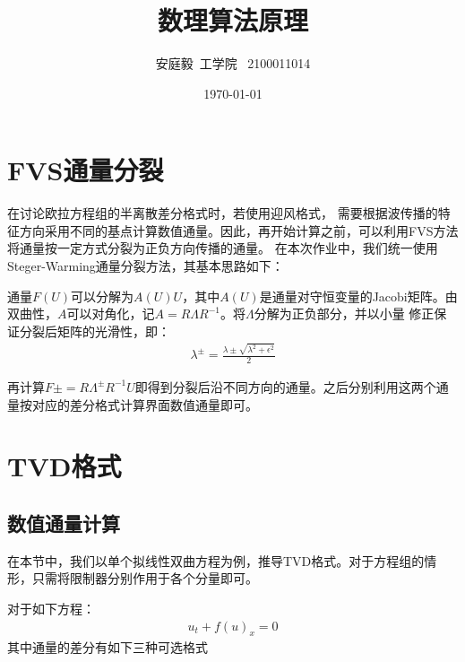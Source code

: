 \documentclass[12pt, a4paper]{article}
\title{数理算法原理}
\author{安庭毅\ 工学院 \ 2100011014}
\date{\today} %
\begin{document}
\maketitle %
\section{FVS通量分裂}
在讨论欧拉方程组的半离散差分格式时，若使用迎风格式，
需要根据波传播的特征方向采用不同的基点计算数值通量。因此，再开始计算之前，可以利用FVS方法将通量按一定方式分裂为正负方向传播的通量。
在本次作业中，我们统一使用Steger-Warming通量分裂方法，其基本思路如下：

通量$F(U)$可以分解为$A(U)U$，其中$A(U)$是通量对守恒变量的Jacobi矩阵。由双曲性，$A$可以对角化，记$A=R\Lambda R^{-1}$。将$\Lambda$分解为正负部分，并以小量
修正保证分裂后矩阵的光滑性，即：
\begin{align}
    \lambda^{\pm} = \frac{\lambda\pm\sqrt{\lambda ^ 2 + \epsilon ^ 2}}{2} 
\end{align}

再计算$F\pm=R\Lambda^{\pm}R^{-1}U$即得到分裂后沿不同方向的通量。之后分别利用这两个通量按对应的差分格式计算界面数值通量即可。
\section{TVD格式}
\subsection{数值通量计算}
在本节中，我们以单个拟线性双曲方程为例，推导TVD格式。对于方程组的情形，只需将限制器分别作用于各个分量即可。

对于如下方程：
\begin{align}
    u_t + f(u)_x = 0 
\end{align}
其中通量的差分有如下三种可选格式
\end{document}
